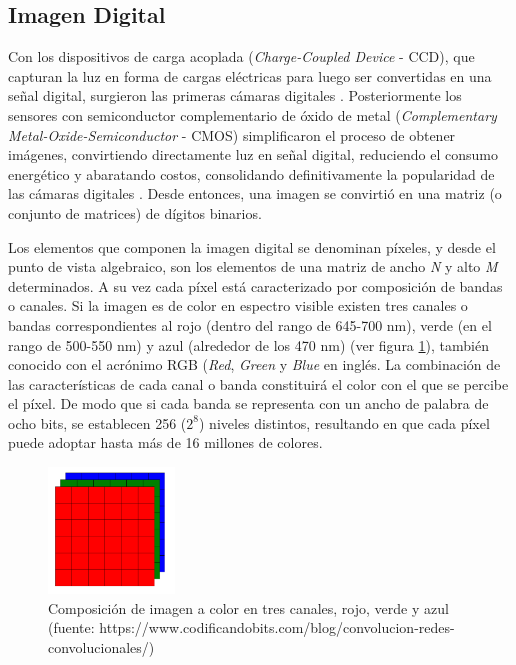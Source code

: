 \subsection{Imagen Digital}
Con los dispositivos de carga acoplada (\textit{Charge-Coupled Device} - CCD), que capturan la luz en forma de cargas eléctricas para luego ser convertidas en una señal digital, surgieron las primeras cámaras digitales \cite{dyck_chapter_1982}. Posteriormente los sensores con semiconductor complementario de óxido de metal (\textit{Complementary Metal-Oxide-Semiconductor} - CMOS) simplificaron el proceso de obtener imágenes, convirtiendo directamente luz en señal digital, reduciendo el consumo energético y abaratando costos, consolidando definitivamente la popularidad de las cámaras digitales \cite{fossum_cmos_1997}. Desde entonces, una imagen se convirtió en una matriz (o conjunto de matrices) de dígitos binarios.

Los elementos que componen la imagen digital se denominan píxeles, y desde el punto de vista algebraico, son los elementos de una matriz de ancho \textit{N} y alto \textit{M} determinados. A su vez cada píxel está caracterizado por composición de bandas o canales. Si la imagen es de color en espectro visible existen tres canales o bandas correspondientes al rojo (dentro del rango de 645-700 nm), verde (en el rango de 500-550 nm) y azul (alrededor de los 470 nm) (ver figura \ref{RGB}), también conocido con el acrónimo RGB (\textit{Red}, \textit{Green} y \textit{Blue} en inglés. La combinación de las características de cada canal o banda constituirá el color con el que se percibe el píxel. De modo que si cada banda se representa con un ancho de palabra de ocho bits, se establecen 256 ($2^8$) niveles distintos, resultando en que cada píxel puede adoptar hasta más de 16 millones de colores.


\begin{figure}[h!]
    \includegraphics[width=0.3\textwidth]{Imagenes/imagen-a-color.png}
     \caption{Composición de imagen a color en tres canales, rojo, verde y azul (fuente: https://www.codificandobits.com/blog/convolucion-redes-convolucionales/)}
    \label{RGB}
\end{figure}


